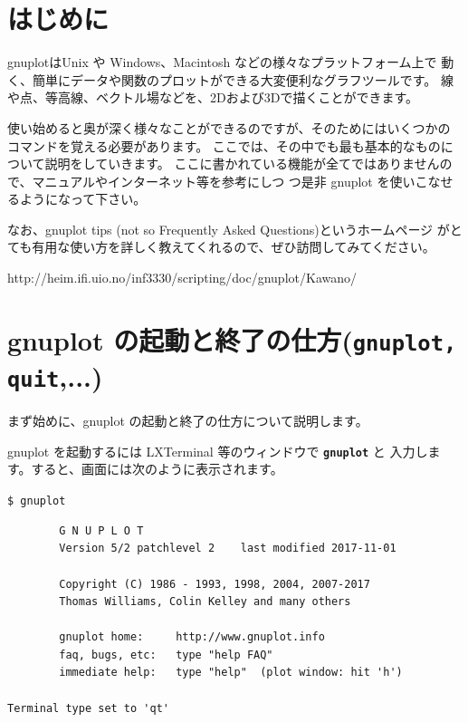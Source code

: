 \documentclass[a4j]{ujarticle} %
\begin{document}
\newpage
\setcounter{section}{-1}

\section{はじめに}
gnuplotはUnix や Windows、Macintosh などの様々なプラットフォーム上で
動く、簡単にデータや関数のプロットができる大変便利なグラフツールです。
線や点、等高線、ベクトル場などを、2Dおよび3Dで描くことができます。

使い始めると奥が深く様々なことができるのですが、そのためにはいくつかの
コマンドを覚える必要があります。
ここでは、その中でも最も基本的なものについて説明をしていきます。
ここに書かれている機能が全てではありませんので、マニュアルやインターネット等を参考にしつ
つ是非 gnuplot を使いこなせるようになって下さい。

なお、gnuplot tips (not so Frequently Asked Questions)というホームページ
がとても有用な使い方を詳しく教えてくれるので、ぜひ訪問してみてください。\\
\begin{center}
http://heim.ifi.uio.no/inf3330/scripting/doc/gnuplot/Kawano/
\end{center}

\section{gnuplot の起動と終了の仕方({\tt\bf gnuplot, quit},...)}
まず始めに、gnuplot の起動と終了の仕方について説明します。

gnuplot を起動するには LXTerminal 等のウィンドウで {\tt\bf gnuplot} と
入力します。すると、画面には次のように表示されます。\\
\begin{framed}
 \begin{minipage}{0.95\textwidth}
  \texttt{\$ gnuplot}
  {\small
  \begin{verbatim}
    	G N U P L O T
    	Version 5/2 patchlevel 2    last modified 2017-11-01
    
    	Copyright (C) 1986 - 1993, 1998, 2004, 2007-2017
    	Thomas Williams, Colin Kelley and many others
    
    	gnuplot home:     http://www.gnuplot.info
    	faq, bugs, etc:   type "help FAQ"
    	immediate help:   type "help"  (plot window: hit 'h')
    
Terminal type set to 'qt'
  \end{verbatim}
  }
 \end{minipage}
\end{framed}
\end{document}
